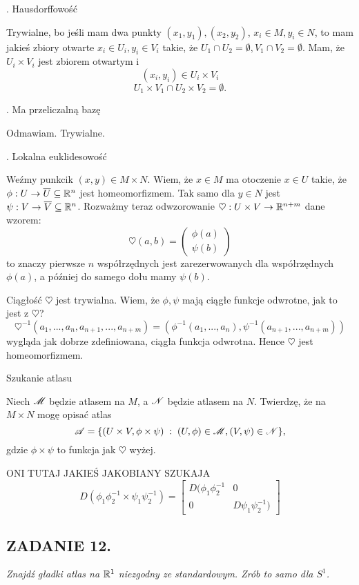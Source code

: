 \documentclass{article}
\begin{document}
. Hausdorffowość

Trywialne, bo jeśli mam dwa punkty $(x_1,y_1), (x_2,y_2)$, $x_i\in M,y_i\in N$, to mam jakieś zbiory otwarte $x_i\in U_i,y_i\in V_i$ takie, że $U_1\cap U_2=\emptyset,V_1\cap V_2=\emptyset$. Mam, że $U_i\times V_i$ jest zbiorem otwartym i
$$(x_i,y_i)\in U_i\times V_i$$
$$U_1\times V_1\cap U_2\times V_2=\emptyset.$$

. Ma przeliczalną bazę

Odmawiam. Trywialne.

. Lokalna euklidesowość

Weźmy punkcik $(x,y)\in M\times N$. Wiem, że $x\in M$ ma otoczenie $x\in U$ takie, że $\phi:U\to \overline U\subseteq \mathbb{R}^n$ jest homeomorfizmem. Tak samo dla $y\in N$ jest $\psi:V\to \overline V\subseteq \mathbb{R}^n$. Rozważmy teraz odwzorowanie $\heartsuit:U\times V\to \mathbb{R}^{n+m}$ dane wzorem:
$$\heartsuit(a, b)=\begin{pmatrix}
    \phi(a)\\
    \psi(b)
\end{pmatrix}$$
to znaczy pierwsze $n$ współrzędnych jest zarezerwowanych dla współrzędnych $\phi(a)$, a później do samego dołu mamy $\psi(b)$.

Ciągłość $\heartsuit$ jest trywialna. Wiem, że $\phi,\psi$ mają ciągłe funkcje odwrotne, jak to jest z $\heartsuit$?
$$\heartsuit^{-1}(a_1,...,a_n,a_{n+1},...,a_{n+m})=(\phi^{-1}(a_1,...,a_n), \psi^{-1}(a_{n+1},...,a_{n+m}))$$
wygląda jak dobrze zdefiniowana, ciągła funkcja odwrotna. Hence $\heartsuit$ jest homeomorfizmem.

\indent Szukanie atlasu

Niech $\mathcal{M}$ będzie atlasem na $M$, a $\mathcal{N}$ będzie atlasem na $N$. Twierdzę, że na $M\times N$ mogę opisać atlas 
$$\mathcal{A}=\{(U\times V, \phi\times\psi)\;:\;(U, \phi)\in\mathcal{M}, (V,\psi)\in\mathcal{N}\},$$
gdzie $\phi\times\psi$ to funkcja jak $\heartsuit$ wyżej.

ONI TUTAJ JAKIEŚ JAKOBIANY SZUKAJA
$$D(\phi_1\phi_2^{-1}\times\psi_1\psi_2^{-1})=\begin{bmatrix}
    D(\phi_1\phi_2^{-1}&0\\0&D\psi_1\psi_2^{-1})
\end{bmatrix}$$

\subsection*{ZADANIE 12.}
\emph{\color{pink}Znajdź gładki atlas na $\mathbb{R}^1$ niezgodny ze standardowym. Zrób to samo dla $S^1$.}
\medskip
\end{document}
